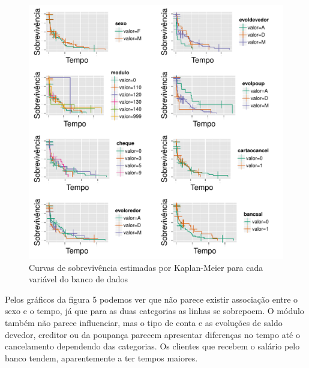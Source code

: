 \documentclass{article}\usepackage[]{graphicx}\usepackage[]{color}
\makeatletter
\def\maxwidth{ %
  \ifdim\Gin@nat@width>\linewidth
    \linewidth
  \else
    \Gin@nat@width
  \fi
}
\newenvironment{knitrout}{}{} %
\makeatother
\begin{document}
\begin{figure}[t!]

\centering
\begin{knitrout}
\color{fgcolor}
\includegraphics[width=\maxwidth]{figure/unnamed-chunk-5} 

\end{knitrout}
\caption{Curvas de sobrevivência estimadas por Kaplan-Meier para cada variável do banco de dados}
\end{figure}

Pelos gráficos da figura 5 podemos ver que não parece existir associação entre o sexo e o tempo, já que para as duas categorias as linhas se sobrepoem. O módulo também não parece influenciar, mas o tipo de conta e as evoluções de saldo devedor, creditor ou da poupança parecem apresentar diferenças no tempo até o cancelamento dependendo das categorias.
Os clientes que recebem o salário pelo banco tendem, aparentemente a ter tempos maiores.
\end{document}
